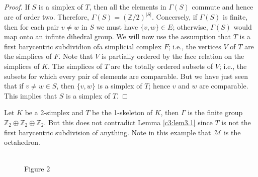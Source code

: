 \begin{proof}
  If $S$ is a simplex of $T$, then all the elements in $\Gamma(S)$
  commute and hence are of order two. Therefore,
  $\Gamma(S)=(\mathbb{Z}/2)^{|S|}$. Concersely, if $\Gamma (S)$ is
  finite, then for each pair $v \neq w$ in $S$ we must have $\{ v, w\}
  \in E$; otherwise, $\Gamma (S)$ would map onto an infinte dihedral
  group. We will now use the assumption that $T$ is a first
  barycentric subdividion of\pageoriginale a simplicial complex $F$; i.e., the
  vertices $V$ of $T$ are the simplices of $F$. Note that $V$ is
  partially ordered by the face relation on the simplices of $K$. The
  simplices of $T$ are the totally ordered subsets of $V$; i.e., the
  subsets for which every pair of elements are comparable. But we have
  just seen that if $v \neq w \in S$, then $\{ v, w\}$ is a simplex of
  $T$; hence $v$ and $w$ are comparable. This implies that $S$ is a
  simplex of $T$.
\end{proof}

\begin{example*}
  Let $K$ be a 2-simplex  and $T$ be the 1-skeleton of $K$, then
  $\Gamma$ is the finite group $\mathbb{Z}_2 \oplus \mathbb{Z}_2 \oplus
  \mathbb{Z}_2$. But this does not contradict Lemma \ref{c3:lem3.1}
  since $T$ is not the first barycentric subdivision of anything. Note
  in this example that $\mathcal{M}$ is the octahedron.
\end{example*}

\begin{figure}[H]
\\
Figure 2
\end{figure}

